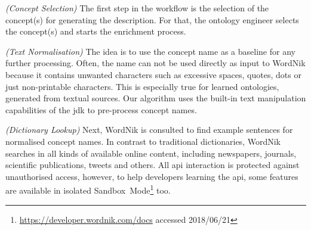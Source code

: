 \begin{enumerate}[label=\textbf{[Step \Roman*]},leftmargin=\widthof{[Step III]}+\labelsep]
	\item \emph{(Concept Selection)} The first step in the workflow is the selection of the concept(s)
	      for generating the description. For that, the ontology engineer selects the concept(s) and
		  starts the enrichment process. 
	\item \emph{(Text Normalisation)} The idea is to use the concept name as a baseline for any further
	      processing. Often, the name can not be used directly as input to WordNik because it
		  contains unwanted characters such as excessive spaces, quotes, dots or just non-printable
		  characters. This is especially true for learned ontologies, generated from textual sources.
		  Our algorithm uses the built-in text manipulation capabilities of the \gls{jdk} to pre-process
		  concept names.
	\item \emph{(Dictionary Lookup)} Next, WordNik is consulted to find example sentences for normalised
	      concept names. In contrast to traditional dictionaries, WordNik searches in all kinds of available
		  online content, including newspapers, journals, scientific publications, tweets and others. All
		  \gls{api} interaction is protected against unauthorised access, however, to help developers learning
		  the \gls{api}, some features are available in isolated Sandbox~Mode\footnote{\url{https://developer.wordnik.com/docs} accessed  2018/06/21} 
		  too.
		  

\end{enumerate}
